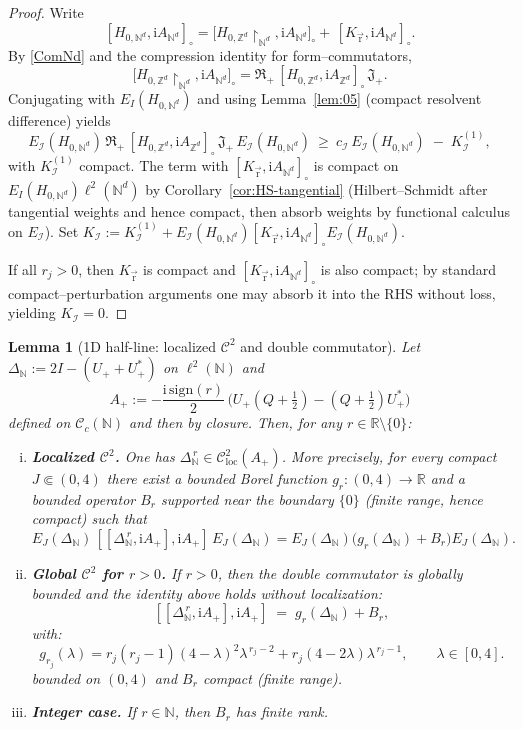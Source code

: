 \documentclass[10pt]{amsart}
\newcommand{\R}{{\mathbb{R}}}
\newcommand{\Z}{{\mathbb{Z}}}
\newcommand{\N}{{\mathbb{N}}}
\newcommand{\1}{{\mathbb{I}}}
\newcommand{\Cc}{\mathcal{C}}
\newcommand{\Ic}{\mathcal{I}}
\numberwithin{equation}{section}
\newtheorem{lemma}[theorem]{Lemma}%
\begin{document}
\begin{proof}
Write
\[
[H_{0,\N^d},\mathrm i A_{\N^d}]_\circ
=\big[H_{0,\Z^d}\!\restriction_{\N^d},\mathrm i A_{\N^d}\big]_\circ
+\,[K_{\vec{\mathrm{r}}},\mathrm i A_{\N^d}]_\circ.
\]
By \eqref{ComNd} and the compression identity for form--commutators,
\[
\big[H_{0,\Z^d}\!\restriction_{\N^d},\mathrm i A_{\N^d}\big]_\circ
=\mathfrak R_+\,[H_{0,\Z^d},\mathrm i A_{\Z^d}]_\circ\,\mathfrak J_+.
\]
Conjugating with $E_I(H_{0,\N^d})$ and using Lemma~\ref{lem:05} (compact resolvent difference)
yields
\[
E_\Ic(H_{0,\N^d})\,\mathfrak R_+\,[H_{0,\Z^d},\mathrm i A_{\Z^d}]_\circ\,\mathfrak J_+\,E_\Ic(H_{0,\N^d})
\ \ge\ c_\Ic\,E_\Ic(H_{0,\N^d})\;-\;K_\Ic^{(1)},
\]
with $K_\Ic^{(1)}$ compact. The term with $[K_{\vec{\mathrm{r}}},\mathrm i A_{\N^d}]_\circ$ is compact on $E_I(H_{0,\N^d})\ell^2(\N^d)$
by Corollary~\ref{cor:HS-tangential} (Hilbert--Schmidt after tangential weights and hence compact, then absorb weights by functional calculus on $E_\Ic$).
Set $K_\Ic:=K_\Ic^{(1)}+E_\Ic(H_{0,\N^d})[K_{\vec{\mathrm{r}}},\mathrm i A_{\N^d}]_\circ E_\Ic(H_{0,\N^d})$.

If all $r_j>0$, then $K_{\vec{\mathrm{r}}}$ is compact and $[K_{\vec{\mathrm{r}}},\mathrm i A_{\N^d}]_\circ$ is also compact;
by standard compact--perturbation arguments one may absorb it into the RHS without loss, yielding $K_\Ic=0$.
\end{proof}
\begin{lemma}[1D half-line: localized $\mathcal{C}^2$ and double commutator]\label{lem:C2-1D-N}
Let $\Delta_{\N}:=2I-(U_+ + U_+^*)$ on $\ell^2(\N)$ and
\[
A_+ := -\frac{\mathrm{i}\,\mathrm{sign}(r)}{2}\,\big(U_+(Q+\tfrac12)-(Q+\tfrac12)U_+^*\big)
\]
defined on $\Cc_c(\N)$ and then by closure. Then, for any $r\in\R\setminus\{0\}$:

\begin{enumerate}[(i)]
\item \textbf{Localized $\mathcal{C}^2$.} One has $\Delta_{\N}^{\,r}\in\mathcal{C}^2_{\mathrm{loc}}(A_+)$.
More precisely, for every compact $J\Subset(0,4)$ there exist a bounded Borel function
$g_r:(0,4)\to\R$ and a bounded operator $B_r$ supported near the boundary $\{0\}$
(finite range, hence compact) such that
\[
E_J(\Delta_{\N})\, [[\Delta_{\N}^{\,r},\mathrm{i}A_+],\mathrm{i}A_+]\, E_J(\Delta_{\N})
= E_J(\Delta_{\N})\big(g_r(\Delta_{\N})+B_r\big)E_J(\Delta_{\N}).
\]

\item \textbf{Global $\mathcal{C}^2$ for $r>0$.} If $r>0$, then the double commutator is globally bounded and the identity above holds without localization:
\[
[[\Delta_{\N}^{\,r},\mathrm{i}A_+],\mathrm{i}A_+] \;=\; g_r(\Delta_{\N})+B_r,\]
with: \[
g_{r_j}(\lambda)
= r_j(r_j-1)(4-\lambda)^2\lambda^{\,r_j-2}
+ r_j(4-2\lambda)\lambda^{\,r_j-1},\qquad \lambda\in[0,4].
\] bounded on $(0,4)$ and $B_r$ compact (finite range).


\item \textbf{Integer case.} If $r\in\N$, then $B_r$ has finite rank.
\end{enumerate}


\end{lemma}
\end{document}
